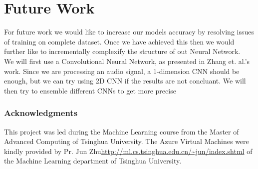 \documentclass{article} %
\begin{document}

\section{Future Work}
	For future work we would like to increase our models accuracy by resolving issues of training on complete dataset. Once we have achieved this then we would further like to incrementally complexify the structure of out Neural Network.\\
	\newline
    We will first use a Convolutional Neural Network, as presented in Zhang et. al.'s work\cite{cite6}. Since we are processing an audio signal, a 1-dimension CNN should be enough, but we can try using 2D CNN if the results are not concluant. We will then try to ensemble different CNNs to get more precise

\subsubsection*{Acknowledgments}

	This project was led during the Machine Learning course from the Master of Advanced Computing of Tsinghua University. The Azure Virtual Machines were kindly provided by Pr. Jun Zhu\url{http://ml.cs.tsinghua.edu.cn/~jun/index.shtml} of the Machine Learning department of Tsinghua University.

\nocite{*}


\end{document}
